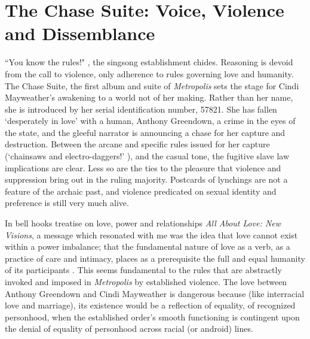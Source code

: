 \documentclass[a4paper, 11pt]{article} %
\begin{document}

\section*{The Chase Suite: Voice, Violence and Dissemblance}

``You know the rules!" \cite{wolfmasters}, the singsong establishment chides.
Reasoning is devoid from the call to violence, only adherence to rules governing love and humanity.
The Chase Suite, the first album and suite of \emph{Metropolis} sets the stage for Cindi Mayweather's awakening to a world not of her making.
Rather than her name, she is introduced by her serial identification number, 57821.
She has fallen `desperately in love' with a human, Anthony Greendown, a crime in the eyes of the state, and the gleeful narrator is announcing a chase for her capture and destruction.
Between the arcane and specific rules issued for her capture (`chainsaws and electro-daggers!' \cite{wolfmasters}), and the casual tone, the fugitive slave law implications are clear.
Less so are the ties to the pleasure that violence and suppression bring out in the ruling majority.
Postcards of lynchings are not a feature of the archaic past, and violence predicated on sexual identity and preference is still very much alive.

In bell hooks treatise on love, power and relationships \emph{All About Love: New Visions}, a message which resonated with me was the idea that love cannot exist within a power imbalance; that the fundamental nature of love as a verb, as a practice of care and intimacy, places as a prerequisite the full and equal humanity of its participants \cite{newvisions}. 
This seems fundamental to the rules that are abstractly invoked and imposed in \emph{Metropolis} by established violence. 
The love between Anthony Greendown and Cindi Mayweather is dangerous because (like interracial love and marriage), its existence would be a reflection of equality, of recognized personhood, when the established order's smooth functioning is contingent upon the denial of equality of personhood across racial (or android) lines. 
\end{document}
